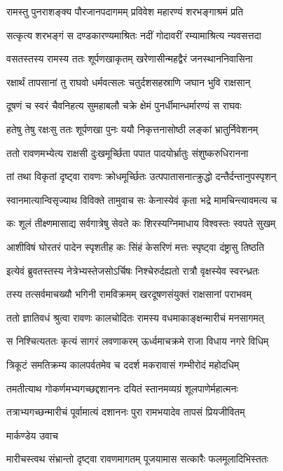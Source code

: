 \twolineshloka
{रामस्तु पुनराशङ्क्य पौरजानपदागमम्}
{प्रविवेश महारण्यं शरभङ्गाश्रमं प्रति}


\twolineshloka
{सत्कृत्य शरभङ्गं स दण्डकारण्यमाश्रितः}
{नदीं गोदावरीं रम्यामाश्रित्य न्यवसत्तदा}


\twolineshloka
{वसतस्तस्य रामस्य ततः शूर्पणखाकृतम्}
{खरेणासीन्महद्वैरं जनस्थाननिवासिना}


\twolineshloka
{रक्षार्थं तापसानां तु राघवो धर्मवत्सलः}
{चतुर्दशसहस्राणि जघान भुवि राक्षसान्}


\twolineshloka
{दूषणं च स्वरं चैवनिहत्य सुमहाबलौ}
{चक्रे क्षेमं पुनर्धीमान्धर्मारण्यं स राघवः}


\twolineshloka
{हतेषु तेषु रक्षःसु ततः शूर्पणखा पुनः}
{ययौ निकृत्तनासोष्ठी लङ्कां भ्रातुर्निवेशनम्}


\twolineshloka
{ततो रावणमभ्येत्य राक्षसी दुःखमूर्च्छिता}
{पपात पादयोर्भ्रातुः संशुष्करुधिरानना}


\twolineshloka
{तां तथा विकृतां दृष्ट्वा रावणः क्रोधमूर्च्छितः}
{उत्पपातासनात्क्रुद्धो दन्तैर्दन्तानुपस्पृशन्}


\twolineshloka
{स्वानमात्यान्विसृज्याथ विविक्ते तामुवाच सः}
{केनास्येवं कृता भद्रे मामचिन्त्यावमत्य च}


\twolineshloka
{कः शूलं तीक्ष्णमासाद्य सर्वगात्रेषु सेवते}
{कः शिरस्यग्निमाधाय विश्वस्तः स्वपते सुखम्}


\twolineshloka
{आशीविषं घोरतरं पादेन स्पृशतीह कः}
{सिंहं केसरिणं मत्तः स्पृष्ट्वा दंष्ट्रासु तिष्ठति}


\twolineshloka
{इत्येवं ब्रुवतस्तस्य नेत्रेभ्यस्तेजसोऽर्चिषः}
{निश्चेरुर्दह्यतो रात्रौ वृक्षस्येव स्वरन्ध्रतः}


\twolineshloka
{तस्य तत्सर्वमाचख्यौ भगिनी रामविक्रमम्}
{खरदूषणसंयुक्तं राक्षसानां पराभवम्}


\twolineshloka
{ततो ज्ञातिवधं श्रुत्वा रावणः कालचोदितः}
{रामस्य वधमाकाङ्क्षन्मारीचं मनसागमत्}


\twolineshloka
{स निश्चित्यततः कृत्यं सागरं लवणाकरम्}
{ऊर्ध्वमाचक्रमे राजा विधाय नगरे विधिम्}


\twolineshloka
{त्रिकूटं समतिक्रम्य कालपर्वतमेव च}
{ददर्श मकरावासं गम्भीरोदं महोदधिम्}


\twolineshloka
{तमतीत्याथ गोकर्णमभ्यगच्छद्दशाननः}
{दयितं स्तानमव्यग्रं शूलपाणेर्महात्मनः}


\twolineshloka
{तत्राभ्यगच्छन्मारीचं पूर्वामात्यं दशाननः}
{पुरा रामभयादेव तापसं प्रियजीवितम्}


\twolineshloka
{मार्कण्डेय उवाच}
{}


\twolineshloka
{मारीचस्त्वथ संभ्रान्तो दृष्ट्वा रावणमागतम्}
{पूजयामास सत्कारैः फलमूलादिभिस्ततः}


